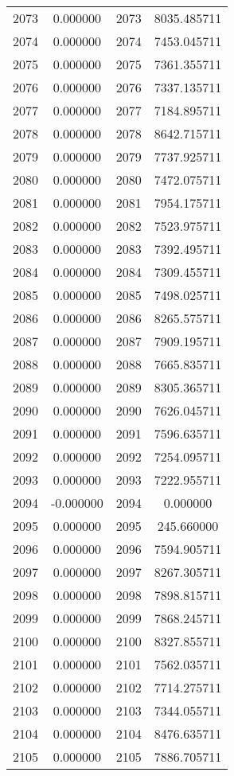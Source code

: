 \documentclass[12pt]{article}
\begin{document}
\begin{longtable}{@{}cccc@{}}
2073 & 0.000000 & 2073 & 8035.485711 \\
2074 & 0.000000 & 2074 & 7453.045711 \\
2075 & 0.000000 & 2075 & 7361.355711 \\
2076 & 0.000000 & 2076 & 7337.135711 \\
2077 & 0.000000 & 2077 & 7184.895711 \\
2078 & 0.000000 & 2078 & 8642.715711 \\
2079 & 0.000000 & 2079 & 7737.925711 \\
2080 & 0.000000 & 2080 & 7472.075711 \\
2081 & 0.000000 & 2081 & 7954.175711 \\
2082 & 0.000000 & 2082 & 7523.975711 \\
2083 & 0.000000 & 2083 & 7392.495711 \\
2084 & 0.000000 & 2084 & 7309.455711 \\
2085 & 0.000000 & 2085 & 7498.025711 \\
2086 & 0.000000 & 2086 & 8265.575711 \\
2087 & 0.000000 & 2087 & 7909.195711 \\
2088 & 0.000000 & 2088 & 7665.835711 \\
2089 & 0.000000 & 2089 & 8305.365711 \\
2090 & 0.000000 & 2090 & 7626.045711 \\
2091 & 0.000000 & 2091 & 7596.635711 \\
2092 & 0.000000 & 2092 & 7254.095711 \\
2093 & 0.000000 & 2093 & 7222.955711 \\
2094 & -0.000000 & 2094 & 0.000000 \\
2095 & 0.000000 & 2095 & 245.660000 \\
2096 & 0.000000 & 2096 & 7594.905711 \\
2097 & 0.000000 & 2097 & 8267.305711 \\
2098 & 0.000000 & 2098 & 7898.815711 \\
2099 & 0.000000 & 2099 & 7868.245711 \\
2100 & 0.000000 & 2100 & 8327.855711 \\
2101 & 0.000000 & 2101 & 7562.035711 \\
2102 & 0.000000 & 2102 & 7714.275711 \\
2103 & 0.000000 & 2103 & 7344.055711 \\
2104 & 0.000000 & 2104 & 8476.635711 \\
2105 & 0.000000 & 2105 & 7886.705711 \\

\end{longtable}
\end{document}

